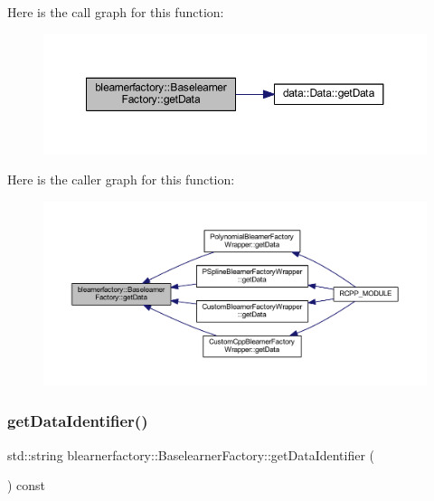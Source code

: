 Here is the call graph for this function\+:\nopagebreak
\begin{figure}[H]
\begin{center}
\leavevmode
\includegraphics[width=350pt]{classblearnerfactory_1_1_baselearner_factory_ad9da09739f04e5c8bd268551251801be_cgraph}
\end{center}
\end{figure}
Here is the caller graph for this function\+:\nopagebreak
\begin{figure}[H]
\begin{center}
\leavevmode
\includegraphics[width=350pt]{classblearnerfactory_1_1_baselearner_factory_ad9da09739f04e5c8bd268551251801be_icgraph}
\end{center}
\end{figure}
\mbox{\label{classblearnerfactory_1_1_baselearner_factory_a40703963bb3fd273b835a99263d9b599}} 
\subsubsection{\texorpdfstring{get\+Data\+Identifier()}{getDataIdentifier()}}
{\footnotesize\ttfamily std\+::string blearnerfactory\+::\+Baselearner\+Factory\+::get\+Data\+Identifier (\begin{DoxyParamCaption}{ }\end{DoxyParamCaption}) const}


